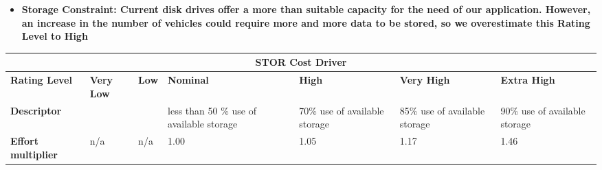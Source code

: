 \begin{itemize}
\item \textbf{Storage Constraint: Current disk drives offer a more than suitable capacity for the need of our application. However, an increase in the number of vehicles could require more and more data to be stored, so we overestimate this Rating Level to High}
\end{itemize}
\hspace*{-3cm}\begin{tabular}{|p{3cm}|p{2cm}|p{2cm}|p{2cm}|p{2cm}|p{2cm}|p{2cm}|}
\hline
\multicolumn{7}{|c|}{\textbf{STOR Cost Driver}}\\
\hline
\hline
\textbf{Rating Level} & \textbf{Very Low} & \textbf{Low} & \textbf{Nominal} & \textbf{High} & \textbf{Very High} & \textbf{Extra High}\\
\hline
\textbf{Descriptor} &  &  & less than 50 \% use of available storage & 70\% use of available storage & 85\% use of available storage& 90\% use of available storage\\
\hline
\textbf{Effort multiplier} & n/a & n/a & 1.00 & 1.05 & 1.17 & 1.46\\
\hline 
\end{tabular}